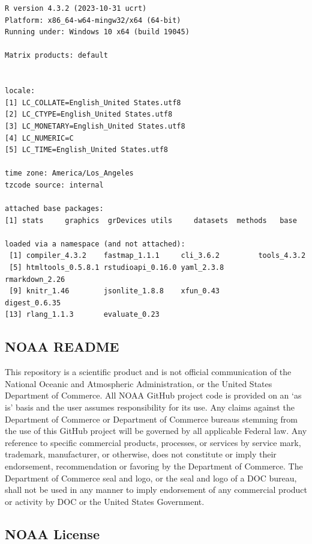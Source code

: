 \documentclass[
  letterpaper,
  oneside,
  open=any]{scrbook}
\begin{document}
\begin{verbatim}
R version 4.3.2 (2023-10-31 ucrt)
Platform: x86_64-w64-mingw32/x64 (64-bit)
Running under: Windows 10 x64 (build 19045)

Matrix products: default


locale:
[1] LC_COLLATE=English_United States.utf8 
[2] LC_CTYPE=English_United States.utf8   
[3] LC_MONETARY=English_United States.utf8
[4] LC_NUMERIC=C                          
[5] LC_TIME=English_United States.utf8    

time zone: America/Los_Angeles
tzcode source: internal

attached base packages:
[1] stats     graphics  grDevices utils     datasets  methods   base     

loaded via a namespace (and not attached):
 [1] compiler_4.3.2    fastmap_1.1.1     cli_3.6.2         tools_4.3.2      
 [5] htmltools_0.5.8.1 rstudioapi_0.16.0 yaml_2.3.8        rmarkdown_2.26   
 [9] knitr_1.46        jsonlite_1.8.8    xfun_0.43         digest_0.6.35    
[13] rlang_1.1.3       evaluate_0.23    
\end{verbatim}

\hypertarget{noaa-readme-1}{%
\subsection{NOAA README}\label{noaa-readme-1}}

This repository is a scientific product and is not official
communication of the National Oceanic and Atmospheric Administration, or
the United States Department of Commerce. All NOAA GitHub project code
is provided on an `as is' basis and the user assumes responsibility for
its use. Any claims against the Department of Commerce or Department of
Commerce bureaus stemming from the use of this GitHub project will be
governed by all applicable Federal law. Any reference to specific
commercial products, processes, or services by service mark, trademark,
manufacturer, or otherwise, does not constitute or imply their
endorsement, recommendation or favoring by the Department of Commerce.
The Department of Commerce seal and logo, or the seal and logo of a DOC
bureau, shall not be used in any manner to imply endorsement of any
commercial product or activity by DOC or the United States Government.

\hypertarget{noaa-license-1}{%
\subsection{NOAA License}\label{noaa-license-1}}
\end{document}
